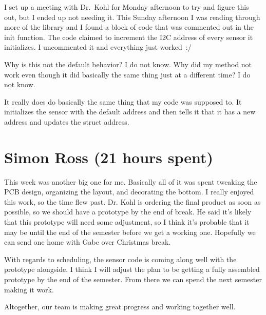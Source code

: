 \documentclass[12pt, titlepage]{article}
\begin{document}
I set up a meeting with Dr.\ Kohl for Monday afternoon to try and figure this out, but I ended up not needing it. This Sunday afternoon I was reading through more of the library and I found a block of code that was commented out in the init function. The code claimed to increment the I2C address of every sensor it initializes. I uncommented it and everything just worked~:/ 

Why is this not the default behavior? I do not know. Why did my method not work even though it did basically the same thing just at a different time? I do not know. 

It really does do basically the same thing that my code was supposed to. It initializes the sensor with the default address and then tells it that it has a new address and updates the struct address. 

\section*{Simon Ross (21 hours spent)}

This week was another big one for me. Basically all of it was spent tweaking the PCB design, organizing the layout, and decorating the bottom. I really enjoyed this work, so the time flew past. Dr. Kohl is ordering the final product as soon as possible, so we should have a prototype by the end of break. He said it's likely that this prototype will need some adjustment, so I think it's probable that it may be until the end of the semester before we get a working one. Hopefully we can send one home with Gabe over Christmas break.

With regards to scheduling, the sensor code is coming along well with the prototype alongside. I think I will adjust the plan to be getting a fully assembled prototype by the end of the semester. From there we can spend the next semester making it work. 

Altogether, our team is making great progress and working together well. 
\end{document}
